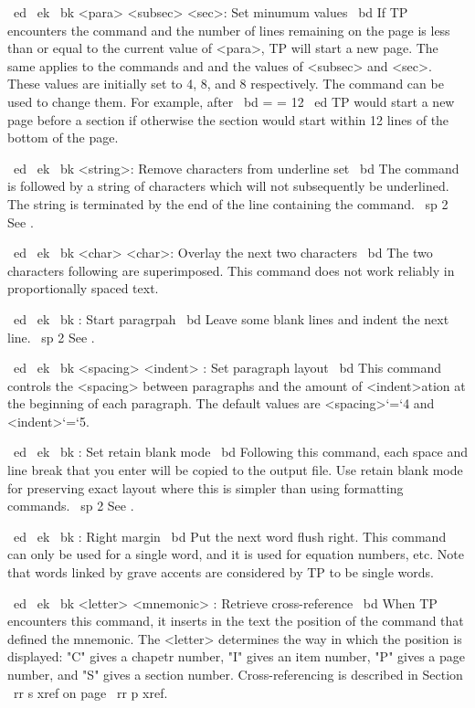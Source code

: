 ~ed ~ek ~bk \MV <para> <subsec> <sec>: Set minumum values
~bd If TP encounters the command \PA and the number of lines remaining
on the page is less than or equal to the current value of <para>,
TP will start a new page.
The same applies to the commands \SS and \SE and the values of <subsec>
and <sec>.
These values are initially set to 4, 8, and 8 respectively.
The command \MV can be used to change them.
For example, after
~bd \MV = = 12 ~ed
TP would start a new page before a section if otherwise the section
would start within 12 lines of the bottom of the page.

~ed ~ek ~bk \NU <string>: Remove characters from underline set
~bd The command \NU is followed by a string of characters which
will not subsequently be underlined.
The string is terminated by the end of the line containing the command.
~sp 2 See \UL.

~ed ~ek ~bk \OV <char> <char>: Overlay the next two characters
~bd The two characters following \OV are superimposed.
This command does not work reliably in proportionally spaced text.

~ed ~ek ~bk \PA: Start paragrpah
~bd Leave some blank lines and indent the next line.
~sp 2 See \PL.

~ed ~ek ~bk \PL <spacing> <indent> : Set paragraph layout
~bd This command controls the <spacing> between paragraphs and the
amount of <indent>ation at the beginning of each paragraph.
The default values are <spacing>`=`4 and <indent>`=`5.

~ed ~ek ~bk \RB: Set retain blank mode
~bd Following this command, each space and line break that you enter will
be copied to the output file.
Use retain blank mode for preserving exact layout where this is simpler than
using formatting commands.
~sp 2 See \SB.

~ed ~ek ~bk \RM: Right margin
~bd
Put the next word flush right.
This command can only be used for a single word, and it is used
for equation numbers, etc.
Note that words linked by grave accents are considered by TP to be
single words.

~ed ~ek ~bk \RR <letter> <mnemonic> : Retrieve cross-reference
~bd When TP encounters this command, it inserts in the text the position
of the \MR command that defined the mnemonic.
The <letter> determines the way in which the position is displayed:
"C" gives a chapetr number, "I" gives an item number, "P" gives a page
number, and "S" gives a section number.
Cross-referencing is described in Section ~rr s xref on page ~rr p xref.

